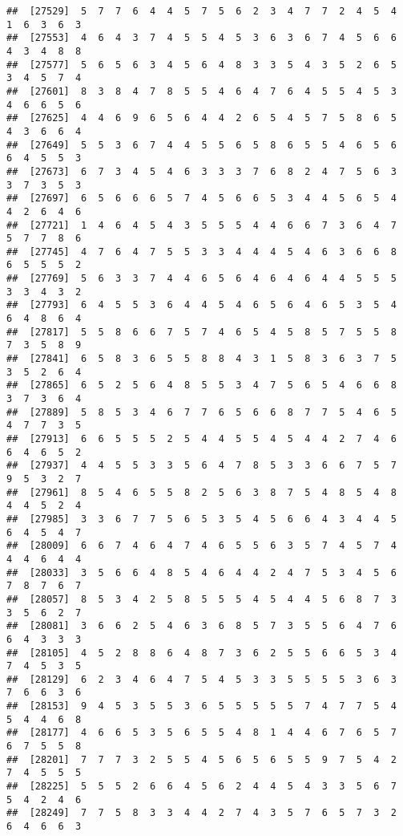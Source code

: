 \documentclass[
]{book}
\begin{document}
\begin{verbatim}
##  [27529]  5  7  7  6  4  4  5  7  5  6  2  3  4  7  7  2  4  5  4  1  6  3  6  3
##  [27553]  4  6  4  3  7  4  5  5  4  5  3  6  3  6  7  4  5  6  6  4  3  4  8  8
##  [27577]  5  6  5  6  3  4  5  6  4  8  3  3  5  4  3  5  2  6  5  3  4  5  7  4
##  [27601]  8  3  8  4  7  8  5  5  4  6  4  7  6  4  5  5  4  5  3  4  6  6  5  6
##  [27625]  4  4  6  9  6  5  6  4  4  2  6  5  4  5  7  5  8  6  5  4  3  6  6  4
##  [27649]  5  5  3  6  7  4  4  5  5  6  5  8  6  5  5  4  6  5  6  6  4  5  5  3
##  [27673]  6  7  3  4  5  4  6  3  3  3  7  6  8  2  4  7  5  6  3  3  7  3  5  3
##  [27697]  6  5  6  6  6  5  7  4  5  6  6  5  3  4  4  5  6  5  4  4  2  6  4  6
##  [27721]  1  4  6  4  5  4  3  5  5  5  4  4  6  6  7  3  6  4  7  5  7  7  8  6
##  [27745]  4  7  6  4  7  5  5  3  3  4  4  4  5  4  6  3  6  6  8  6  5  5  5  2
##  [27769]  5  6  3  3  7  4  4  6  5  6  4  6  4  6  4  4  5  5  5  3  3  4  3  2
##  [27793]  6  4  5  5  3  6  4  4  5  4  6  5  6  4  6  5  3  5  4  6  4  8  6  4
##  [27817]  5  5  8  6  6  7  5  7  4  6  5  4  5  8  5  7  5  5  8  7  3  5  8  9
##  [27841]  6  5  8  3  6  5  5  8  8  4  3  1  5  8  3  6  3  7  5  3  5  2  6  4
##  [27865]  6  5  2  5  6  4  8  5  5  3  4  7  5  6  5  4  6  6  8  3  7  3  6  4
##  [27889]  5  8  5  3  4  6  7  7  6  5  6  6  8  7  7  5  4  6  5  4  7  7  3  5
##  [27913]  6  6  5  5  5  2  5  4  4  5  5  4  5  4  4  2  7  4  6  6  4  6  5  2
##  [27937]  4  4  5  5  3  3  5  6  4  7  8  5  3  3  6  6  7  5  7  9  5  3  2  7
##  [27961]  8  5  4  6  5  5  8  2  5  6  3  8  7  5  4  8  5  4  8  4  4  5  2  4
##  [27985]  3  3  6  7  7  5  6  5  3  5  4  5  6  6  4  3  4  4  5  6  4  5  4  7
##  [28009]  6  6  7  4  6  4  7  4  6  5  5  6  3  5  7  4  5  7  4  4  4  6  4  4
##  [28033]  3  5  6  6  4  8  5  4  6  4  4  2  4  7  5  3  4  5  6  7  8  7  6  7
##  [28057]  8  5  3  4  2  5  8  5  5  5  4  5  4  4  5  6  8  7  3  3  5  6  2  7
##  [28081]  3  6  6  2  5  4  6  3  6  8  5  7  3  5  5  6  4  7  6  6  4  3  3  3
##  [28105]  4  5  2  8  8  6  4  8  7  3  6  2  5  5  6  6  5  3  4  7  4  5  3  5
##  [28129]  6  2  3  4  6  4  7  5  4  5  3  3  5  5  5  5  3  6  3  7  6  6  3  6
##  [28153]  9  4  5  3  5  5  3  6  5  5  5  5  5  7  4  7  7  5  4  5  4  4  6  8
##  [28177]  4  6  6  5  3  5  6  5  5  4  8  1  4  4  6  7  6  5  7  6  7  5  5  8
##  [28201]  7  7  7  3  2  5  5  4  5  6  5  6  5  5  9  7  5  4  2  7  4  5  5  5
##  [28225]  5  5  5  2  6  6  4  5  6  2  4  4  5  4  3  3  5  6  7  5  4  2  4  6
##  [28249]  7  7  5  8  3  3  4  4  2  7  4  3  5  7  6  5  7  3  2  6  4  6  6  3

\end{verbatim}
\end{document}
